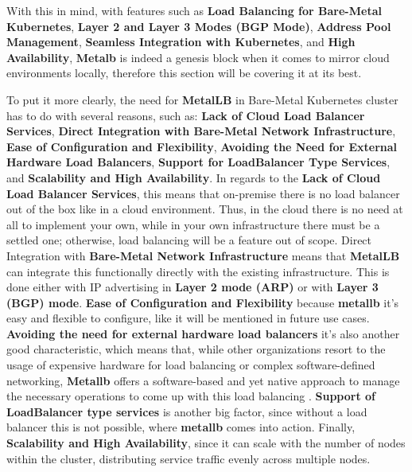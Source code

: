 With this in mind, with features such as \textbf{Load Balancing for Bare-Metal Kubernetes}, \textbf{Layer 2 and Layer 3 Modes (BGP Mode)}, \textbf{Address Pool Management}, \textbf{Seamless Integration with Kubernetes}, and \textbf{High Availability}, \textbf{Metalb} is indeed a genesis block when it comes to mirror cloud environments locally, therefore this section will be covering it at its best.

To put it more clearly, the need for \textbf{MetalLB} in Bare-Metal Kubernetes cluster has to do with several reasons, such as: \textbf{Lack of Cloud Load Balancer Services}, \textbf{Direct Integration with Bare-Metal Network Infrastructure}, \textbf{Ease of Configuration and Flexibility}, \textbf{Avoiding the Need for External Hardware Load Balancers}, \textbf{Support for LoadBalancer Type Services}, and \textbf{Scalability and High Availability}. In regards to the \textbf{Lack of Cloud Load Balancer Services}, this means that on-premise there is no load balancer out of the box like in a cloud environment. Thus, in the cloud there is no need at all to implement your own, while in your own infrastructure there must be a settled one; otherwise, load balancing will be a feature out of scope. Direct Integration with \textbf{Bare-Metal Network Infrastructure} means that \textbf{MetalLB} can integrate this functionally directly with the existing infrastructure. This is done either with IP advertising in \textbf{Layer 2 mode (ARP)} or with \textbf{Layer 3 (BGP) mode}. \textbf{Ease of Configuration and Flexibility} because \textbf{metallb} it's easy and flexible to configure, like it will be mentioned in future use cases. \textbf{Avoiding the need for external hardware load balancers} it's also another good characteristic, which means that, while other organizations resort to the usage of expensive hardware for load balancing or complex software-defined networking, \textbf{Metallb} offers a software-based and yet native approach to manage the necessary operations to come up with this load balancing \cite{hardware-vs-on-premise}. \textbf{Support of LoadBalancer type services} is another big factor, since without a load balancer this is not possible, where \textbf{metallb} comes into action. Finally, \textbf{Scalability and High Availability}, since it can scale with the number of nodes within the cluster, distributing service traffic evenly across multiple nodes.

